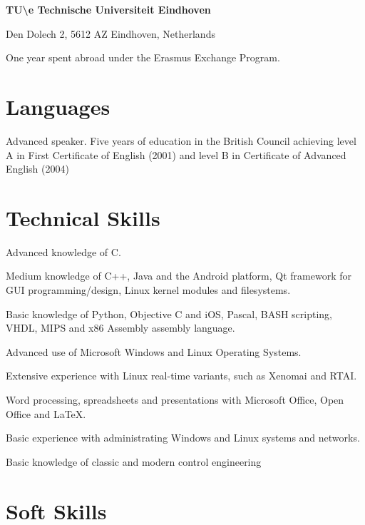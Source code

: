 {
\textbf{TU\textbackslash e Technische Universiteit Eindhoven}

Den Dolech 2, 5612 AZ Eindhoven, Netherlands
}
{
One year spent abroad under the Erasmus Exchange Program.
}

\section*{Languages}

{
Advanced speaker. Five years of education in the British Council achieving
level A in First Certificate of English (2001) and level B in Certificate of
Advanced English (2004)
}


\section*{Technical Skills}

{
Advanced knowledge of C.
			
Medium knowledge of C++, Java and the Android platform, Qt framework for GUI
programming/design, Linux kernel modules and filesystems.
			
Basic knowledge of Python, Objective C and iOS, Pascal, BASH scripting, VHDL,
MIPS and x86 Assembly assembly language.
}
%			 
%
{
Advanced use of Microsoft Windows and Linux Operating Systems.

Extensive experience with Linux real-time variants, such as Xenomai and RTAI.

Word processing, spreadsheets and presentations with Microsoft Office, Open
Office and \LaTeX.

Basic experience with administrating Windows and Linux systems and networks.

Basic knowledge of classic and modern control engineering
}


\section*{Soft Skills}

